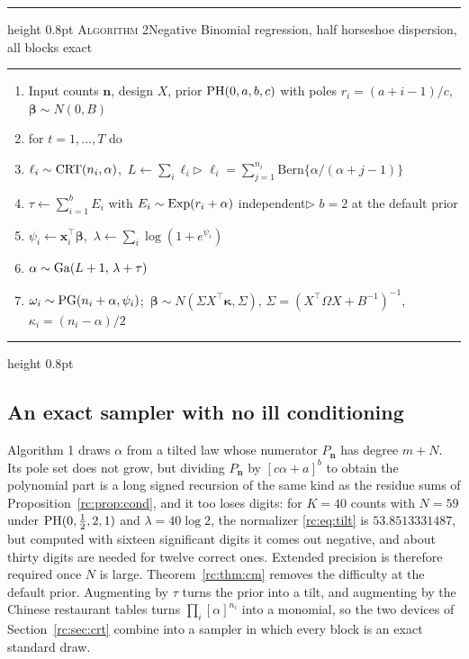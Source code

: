 \begin{center}
\begin{minipage}{\textwidth}
\small
\hrule height 0.8pt\smallskip
\textsc{Algorithm 2}\enspace Negative Binomial regression, half horseshoe dispersion, all blocks exact
\smallskip\hrule\smallskip
\begin{enumerate}[label={\footnotesize\arabic*:},leftmargin=1.8em,itemsep=1pt,topsep=0pt]
\item Input counts $\bm n$, design $X$, prior $\mathrm{PH}(0,a,b,c)$ with poles $r_i=(a+i-1)/c$, $\bm\beta\sim N(0,B)$
\item for $t=1,\dots,T$ do
\item \hspace{1em}$\ell_i\sim\mathrm{CRT}(n_i,\alpha)$,\ $L\leftarrow\sum_i\ell_i$\hfill$\triangleright$ $\ell_i=\sum_{j=1}^{n_i}\mathrm{Bern}\{\alpha/(\alpha+j-1)\}$
\item \hspace{1em}$\tau\leftarrow\sum_{i=1}^bE_i$ with $E_i\sim\mathrm{Exp}(r_i+\alpha)$ independent\hfill$\triangleright$ $b=2$ at the default prior
\item \hspace{1em}$\psi_i\leftarrow\bm x_i^\top\bm\beta$,\ $\lambda\leftarrow\sum_i\log(1+e^{\psi_i})$
\item \hspace{1em}$\alpha\sim\mathrm{Ga}(L+1,\,\lambda+\tau)$
\item \hspace{1em}$\omega_i\sim\mathrm{PG}(n_i+\alpha,\psi_i)$;\ $\bm\beta\sim N(\Sigma X^\top\bm\kappa,\Sigma)$, $\Sigma=(X^\top\Omega X+B^{-1})^{-1}$, $\kappa_i=(n_i-\alpha)/2$
\end{enumerate}
\smallskip\hrule height 0.8pt
\end{minipage}
\end{center}

\subsection{An exact sampler with no ill conditioning}\label{rc:sec:exact}

Algorithm 1 draws $\alpha$ from a tilted law whose numerator $P_{\bm n}$ has degree $m+N$. Its pole set does not grow, but dividing $P_{\bm n}$ by $[c\alpha+a]^b$ to obtain the polynomial part is a long signed recursion of the same kind as the residue sums of Proposition~\ref{rc:prop:cond}, and it too loses digits: for $K=40$ counts with $N=59$ under $\mathrm{PH}(0,\frac12,2,1)$ and $\lambda=40\log2$, the normalizer \eqref{rc:eq:tilt} is $53.8513331487$, but computed with sixteen significant digits it comes out negative, and about thirty digits are needed for twelve correct ones. Extended precision is therefore required once $N$ is large. Theorem~\ref{rc:thm:cm} removes the difficulty at the default prior. Augmenting by $\tau$ turns the prior into a tilt, and augmenting by the Chinese restaurant tables turns $\prod_i[\alpha]^{n_i}$ into a monomial, so the two devices of Section~\ref{rc:sec:crt} combine into a sampler in which every block is an exact standard draw.

